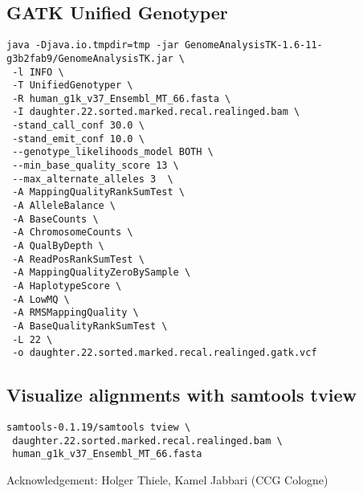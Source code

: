 \documentclass{article}
\begin{document}
\subsection{ GATK Unified Genotyper}
\begin{verbatim}
java -Djava.io.tmpdir=tmp -jar GenomeAnalysisTK-1.6-11-g3b2fab9/GenomeAnalysisTK.jar \
 -l INFO \
 -T UnifiedGenotyper \
 -R human_g1k_v37_Ensembl_MT_66.fasta \
 -I daughter.22.sorted.marked.recal.realinged.bam \
 -stand_call_conf 30.0 \
 -stand_emit_conf 10.0 \
 --genotype_likelihoods_model BOTH \
 --min_base_quality_score 13 \
 --max_alternate_alleles 3  \
 -A MappingQualityRankSumTest \
 -A AlleleBalance \
 -A BaseCounts \
 -A ChromosomeCounts \
 -A QualByDepth \
 -A ReadPosRankSumTest \
 -A MappingQualityZeroBySample \
 -A HaplotypeScore \
 -A LowMQ \
 -A RMSMappingQuality \
 -A BaseQualityRankSumTest \
 -L 22 \
 -o daughter.22.sorted.marked.recal.realinged.gatk.vcf
\end{verbatim} 

\subsection{ Visualize alignments with samtools tview }
\begin{verbatim}
samtools-0.1.19/samtools tview \
 daughter.22.sorted.marked.recal.realinged.bam \
 human_g1k_v37_Ensembl_MT_66.fasta
\end{verbatim}
Acknowledgement: Holger Thiele, Kamel Jabbari (CCG Cologne)
\end{document}
